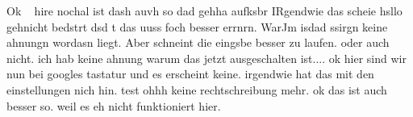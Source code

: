  
 
 Ok   hire nochal ist dash auvh so dad gehha aufksbr
 IRgendwie das scheie hsllo gehnicht bedstrt dsd t das uuss foch besser errnrn. WarJm isdad ssirgn keine ahnungn wordasn liegt.
 Aber schneint die eingsbe besser zu laufen. oder auch nicht. ich hab keine ahnung warum das jetzt ausgeschalten ist.... ok hier sind wir nun bei googles tastatur und es erscheint keine. irgendwie hat das mit den einstellungen nich hin.
 test ohhh keine rechtschreibung mehr. ok das ist auch besser so. weil es eh nicht funktioniert hier.
 
 
 
 
 
 
 
 